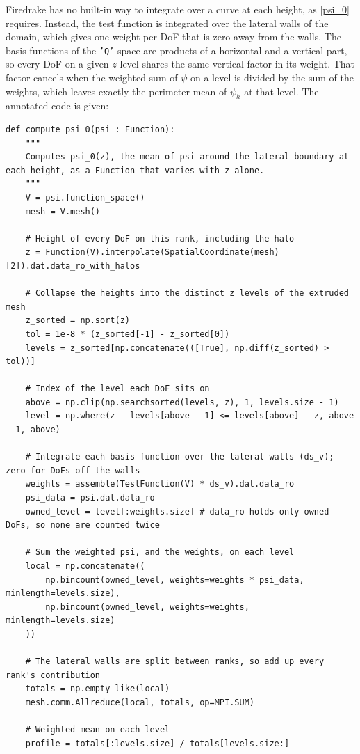 \documentclass{article}
\begin{document}
\begin{appendices}
Firedrake has no built-in way to integrate over a curve at each height, as \cref{psi_0} requires.
Instead, the test function is integrated over the lateral walls of the domain, which gives one weight per DoF that is zero away from the walls.
The basis functions of the \texttt{'Q'} space are products of a horizontal and a vertical part, so every DoF on a given $z$ level shares the same vertical factor in its weight.
That factor cancels when the weighted sum of $\psi$ on a level is divided by the sum of the weights, which leaves exactly the perimeter mean of $\psi_h$ at that level.
The annotated code is given:

\begin{verbatim}
def compute_psi_0(psi : Function):
    """
    Computes psi_0(z), the mean of psi around the lateral boundary at each height, as a Function that varies with z alone.
    """
    V = psi.function_space()
    mesh = V.mesh()

    # Height of every DoF on this rank, including the halo
    z = Function(V).interpolate(SpatialCoordinate(mesh)[2]).dat.data_ro_with_halos

    # Collapse the heights into the distinct z levels of the extruded mesh
    z_sorted = np.sort(z)
    tol = 1e-8 * (z_sorted[-1] - z_sorted[0])
    levels = z_sorted[np.concatenate(([True], np.diff(z_sorted) > tol))]

    # Index of the level each DoF sits on
    above = np.clip(np.searchsorted(levels, z), 1, levels.size - 1)
    level = np.where(z - levels[above - 1] <= levels[above] - z, above - 1, above)

    # Integrate each basis function over the lateral walls (ds_v); zero for DoFs off the walls
    weights = assemble(TestFunction(V) * ds_v).dat.data_ro
    psi_data = psi.dat.data_ro
    owned_level = level[:weights.size] # data_ro holds only owned DoFs, so none are counted twice

    # Sum the weighted psi, and the weights, on each level
    local = np.concatenate((
        np.bincount(owned_level, weights=weights * psi_data, minlength=levels.size),
        np.bincount(owned_level, weights=weights, minlength=levels.size)
    ))

    # The lateral walls are split between ranks, so add up every rank's contribution
    totals = np.empty_like(local)
    mesh.comm.Allreduce(local, totals, op=MPI.SUM)

    # Weighted mean on each level
    profile = totals[:levels.size] / totals[levels.size:]


\end{verbatim}
\end{appendices}
\end{document}
